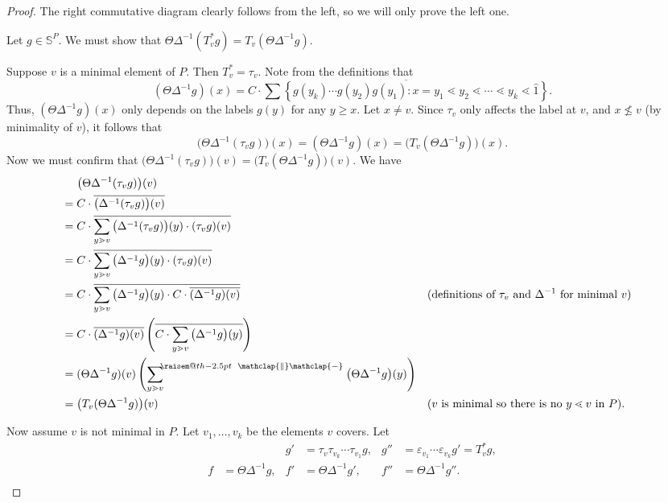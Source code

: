 \documentclass[ALCO,ThmDefs,Unicode,epreuves]{cedram}
\makeatletter
\newcommand{\raisemath}[1]{\mathpalette{\raisem@th{#1}}}
\newcommand{\raisem@th}[3]{\raisebox{#1}{$#2#3$}}
\def\parallelsum{\:\ \mathclap{\|}\mathclap{-}\ \:}
\newcommand{\sumparlimitlower}[1]{{\sum\limits_{#1}}^{\hspace{-3 pt}\raisemath{-2.5pt}{\parallelsum}}\hspace{-2.9pt}}
\newcommand{\bbs}{\mathbb{S}}
\newcommand{\e}{\varepsilon}
\newcommand{\up}{\Delta}
\makeatother
\begin{document}
\begin{proof}
The right commutative diagram clearly follows from the left, so we will only prove the left one.

Let $g\in\bbs^P$. We must show that
$\Theta \up^{-1} (T_v^*g) = T_v(\Theta\up^{-1} g)$.

Suppose $v$ is a minimal element of $P$. Then $T_v^*=\tau_v$. Note from the definitions that 
\[
(\Theta\up^{-1} g)(x) =
C\cdot \overline{\sum\left\{ g(y_k)\cdots g(y_2)g(y_1):
 x=y_1\lessdot y_2 \lessdot \cdots \lessdot y_k\lessdot \widehat{1} \right\}} .
\]
Thus, $(\Theta\up^{-1} g)(x)$ only depends on the labels $g(y)$ for any $y\geq x$.
Let $x\not=v$. Since $\tau_v$ only affects the label at $v$, and $x\not\leq v$ (by minimality of $v$), it follows that 
\[
\big(\Theta\up^{-1} (\tau_v g)\big)(x)=
(\Theta\up^{-1} g)(x)=
\big(T_v(\Theta\up^{-1} g)\big)(x).\]
Now we must confirm that
$\big(\Theta\up^{-1} (\tau_v g)\big)(v)=\big(T_v(\Theta\up^{-1} g)\big)(v).$
We have
\begin{align*}
&\phantom{=l}\big(\Theta\up^{-1} (\tau_v g)\big)(v)\\
&= C\cdot \overline{\big(\up^{-1} (\tau_v g)\big)(v)}\\
&= C\cdot \overline{\sum\limits_{y\gtrdot v}\big(\up^{-1}(\tau_v g)\big)(y)\cdot(\tau_v g)(v)}\\
&= C\cdot \overline{\sum\limits_{y\gtrdot v}\big(\up^{-1}g\big)(y)\cdot(\tau_v g)(v)}\\
&= C\cdot \overline{\sum\limits_{y\gtrdot v}\big(\up^{-1}g\big)(y)\cdot C\cdot\overline{(\up^{-1}g)(v)}}
&&\text{(definitions of $\tau_v$ and $\up^{-1}$ for minimal $v$)}
\\
&=C\cdot \overline{(\up^{-1}g)(v)}\left(\overline{C\cdot \sum\limits_{y\gtrdot v}\big(\up^{-1}g\big)(y)}\right)\\
&=(\Theta\up^{-1}g)(v)\left(\sumparlimitlower{y\gtrdot v}\big(\Theta\up^{-1}g\big)(y)\right)\\
&=\big(T_v(\Theta\up^{-1} g)\big)(v)
&&\text{($v$ is minimal so there is no $y\lessdot v$ in $P$).}
\end{align*}

Now assume $v$ is not minimal in $P$. Let $v_1,\dots,v_k$ be the elements $v$ covers. Let
\begin{align*}
&&g' &= \tau_v\tau_{v_k}\cdots \tau_{v_1} g,
&g'' &= \e_{v_1}\cdots \e_{v_k} g' = T_v^* g,\\
f &= \Theta\up^{-1}g,
&f' &= \Theta\up^{-1}g',
&f'' &= \Theta\up^{-1}g''.\\
\end{align*}


\end{proof}
\end{document}
